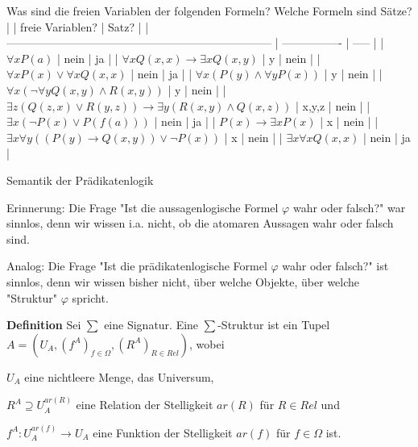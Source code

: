 \documentclass[a4paper]{article}
\renewcommand{\note}[2]{\begin{noteBox} \textbf{#1} #2 \end{noteBox}}
\begin{document}
\begin{multicols}{3}
  Was sind die freien Variablen der folgenden Formeln? Welche Formeln sind Sätze?
  |                                                                         | freie Variablen? | Satz? |
  | ----------------------------------------------------------------------- | ---------------- | ----- |
  | $\forall x P(a)$                                                        | nein             | ja    |
  | $\forall x Q(x,x)\rightarrow\exists x Q(x,y)$                           | y                | nein  |
  | $\forall x P(x)\vee\forall x Q(x,x)$                                    | nein             | ja    |
  | $\forall x(P(y)\wedge\forall y P(x))$                                   | y                | nein  |
  | $\forall x(\lnot\forall y Q(x,y)\wedge R(x,y))$                         | y                | nein  |
  | $\exists z(Q(z,x)\vee R(y,z))\rightarrow\exists y(R(x,y)\wedge Q(x,z))$ | x,y,z            | nein  |
  | $\exists x(\lnot P(x)\vee P(f(a)))$                                     | nein             | ja    |
  | $P(x)\rightarrow\exists x P(x)$                                         | x                | nein  |
  | $\exists x\forall y((P(y)\rightarrow Q(x,y))\vee\lnot P(x))$            | x                | nein  |
  | $\exists x\forall x Q(x,x)$                                             | nein             | ja    |

  Semantik der Prädikatenlogik
  \begin{itemize*}
    \item Erinnerung: Die Frage "Ist die aussagenlogische Formel $\varphi$ wahr oder falsch?" war sinnlos, denn wir wissen i.a. nicht, ob die atomaren Aussagen wahr oder falsch sind.
    \item Analog: Die Frage "Ist die prädikatenlogische Formel $\varphi$ wahr oder falsch?" ist sinnlos, denn wir wissen bisher nicht, über welche Objekte, über welche "Struktur" $\varphi$ spricht.
  \end{itemize*}

  \note{Definition}{Sei $\sum$ eine Signatur. Eine $\sum$-Struktur ist ein Tupel $A=(U_A,(f^A)_{f\in\Omega},(R^A)_{R\in Rel})$, wobei
    \begin{itemize*}
      \item $U_A$ eine nichtleere Menge, das Universum,
      \item $R^A\supseteq U_A^{ar(R)}$ eine Relation der Stelligkeit $ar(R)$ für $R\in Rel$ und
      \item $f^A:U_A^{ar(f)}\rightarrow U_A$ eine Funktion der Stelligkeit $ar(f)$ für $f\in\Omega$ ist.
    \end{itemize*}
  }


\end{multicols}
\end{document}
